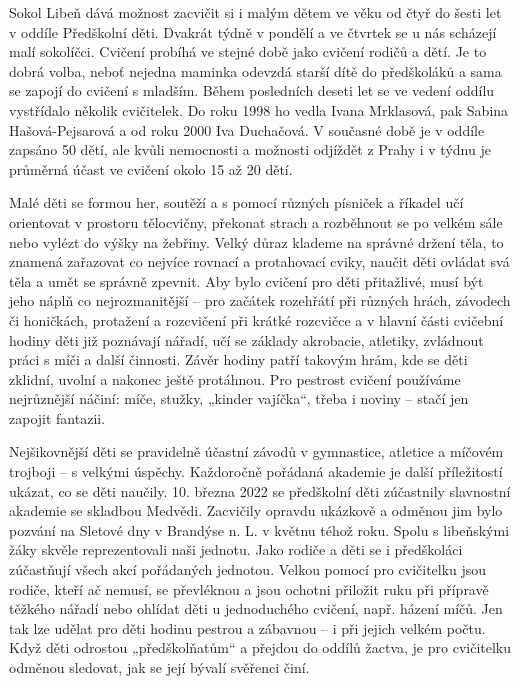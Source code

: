 Sokol Libeň dává možnost zacvičit si i malým dětem ve věku od čtyř do
šesti let v oddíle Předškolní děti. Dvakrát týdně v pondělí a ve čtvrtek
se u nás scházejí malí sokolíčci. Cvičení probíhá ve stejné době jako
cvičení rodičů a dětí. Je to dobrá volba, neboť nejedna maminka odevzdá
starší dítě do předškoláků a sama se zapojí do cvičení s mladším. Během
posledních deseti let se ve vedení oddílu vystřídalo několik cvičitelek.
Do roku 1998 ho vedla Ivana Mrklasová, pak Sabina Hašová-Pejsarová a od
roku 2000 Iva Duchačová. V současné době je v oddíle zapsáno 50 dětí,
ale kvůli nemocnosti a možnosti odjíždět z Prahy i v týdnu je průměrná
účast ve cvičení okolo 15 až 20 dětí.

Malé děti se formou her, soutěží a s pomocí různých písniček a říkadel
učí orientovat v prostoru tělocvičny, překonat strach a rozběhnout se po
velkém sále nebo vylézt do výšky na žebřiny. Velký důraz klademe na
správné držení těla, to znamená zařazovat co nejvíce rovnací a
protahovací cviky, naučit děti ovládat svá těla a umět se správně
zpevnit. Aby bylo cvičení pro děti přitažlivé, musí být jeho náplň co
nejrozmanitější -- pro začátek rozehřátí při různých hrách, závodech či
honičkách, protažení a rozcvičení při krátké rozcvičce a v hlavní části
cvičební hodiny děti již poznávají nářadí, učí se základy akrobacie,
atletiky, zvládnout práci s míči a další činnosti. Závěr hodiny patří
takovým hrám, kde se děti zklidní, uvolní a nakonec ještě protáhnou. Pro
pestrost cvičení používáme nejrůznější náčiní: míče, stužky, „kinder
vajíčka``, třeba i noviny -- stačí jen zapojit fantazii.

Nejšikovnější děti se pravidelně účastní závodů v gymnastice, atletice a
míčovém trojboji -- s velkými úspěchy. Každoročně pořádaná akademie je
další příležitostí ukázat, co se děti naučily. 10. března 2022 se
předškolní děti zúčastnily slavnostní akademie se skladbou Medvědi.
Zacvičily opravdu ukázkově a odměnou jim bylo pozvání na Sletové dny v
Brandýse n. L. v květnu téhož roku. Spolu s libeňskými žáky skvěle
reprezentovali naši jednotu. Jako rodiče a děti se i předškoláci
zúčastňují všech akcí pořádaných jednotou. Velkou pomocí pro cvičitelku
jsou rodiče, kteří ač nemusí, se převléknou a jsou ochotni přiložit ruku
při přípravě těžkého nářadí nebo ohlídat děti u jednoduchého cvičení,
např. házení míčů. Jen tak lze udělat pro děti hodinu pestrou a zábavnou
-- i při jejich velkém počtu. Když děti odrostou „předškolňatům`` a
přejdou do oddílů žactva, je pro cvičitelku odměnou sledovat, jak se
její bývalí svěřenci činí.

